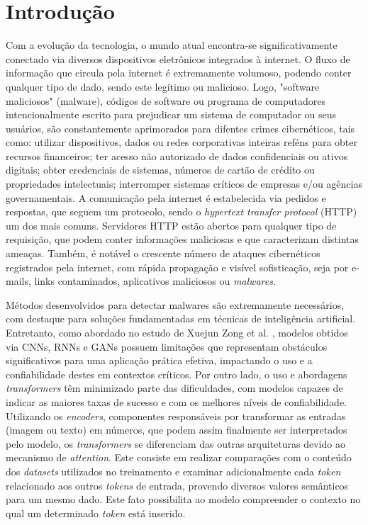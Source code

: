 \section{Introdução}
   Com a evolução da tecnologia, o mundo atual encontra-se significativamente conectado via diversos dispositivos eletrônicos integrados à internet. O fluxo de informação que circula pela internet é extremamente volumoso, podendo conter qualquer tipo de dado, sendo este legítimo ou malicioso. Logo, "software maliciosos" (malware), códigos de software ou programa de computadores intencionalmente escrito para prejudicar um sistema de computador ou seus usuários, são constantemente aprimorados para difentes crimes cibernéticos, tais como: utilizar dispositivos, dados ou redes corporativas inteiras reféns para obter recursos financeiros; ter acesso não autorizado de dados confidenciais ou ativos digitais; obter credenciais de sistemas, números de cartão de crédito ou propriedades intelectuais; interromper sistemas críticos de empresas e/ou agências governamentais. A comunicação pela internet é estabelecida via pedidos e respostas, que seguem um protocolo, sendo o \textit{hypertext transfer protocol} (HTTP) um dos mais comuns. Servidores HTTP estão abertos para qualquer tipo de requisição, que podem conter informações maliciosas e que caracterizam distintas ameaças. Também, é notável o crescente número de ataques cibernéticos registrados pela internet, com rápida propagação e visível sofisticação, seja por e-mails, links contaminados, aplicativos maliciosos ou \textit{malwares}. 
   
   Métodos desenvolvidos para detectar malwares são extremamente necessários, com destaque para soluções fundamentadas em técnicas de inteligência artificial. Entretanto, como abordado no estudo de Xuejun Zong et al. \cite{he2024network}, modelos obtidos via CNNs, RNNs e GANs possuem limitações que representam obstáculos significativos para uma aplicação prática efetiva, impactando o uso e a confiabilidade destes em contextos críticos. Por outro lado, o uso e abordagens \textit{transformers} têm minimizado parte das dificuldades, com modelos capazes de indicar as maiores taxas de sucesso e com os melhores níveis de confiabilidade. Utilizando os \textit{encoders}, componentes responsáveis por transformar as entradas (imagem ou texto) em números, que podem assim finalmente ser interpretados pelo modelo, os \textit{transformers} se diferenciam das outras arquiteturas devido ao mecanismo de \textit{attention}. Este consiste em realizar comparações com o conteúdo dos \textit{datasets} utilizados no treinamento e examinar adicionalmente cada \textit{token} relacionado aos outros \textit{tokens} de entrada, provendo diversos valores semânticos para um mesmo dado. Este fato possibilita ao modelo compreender o contexto no qual um determinado \textit{token} está inserido. 
   
